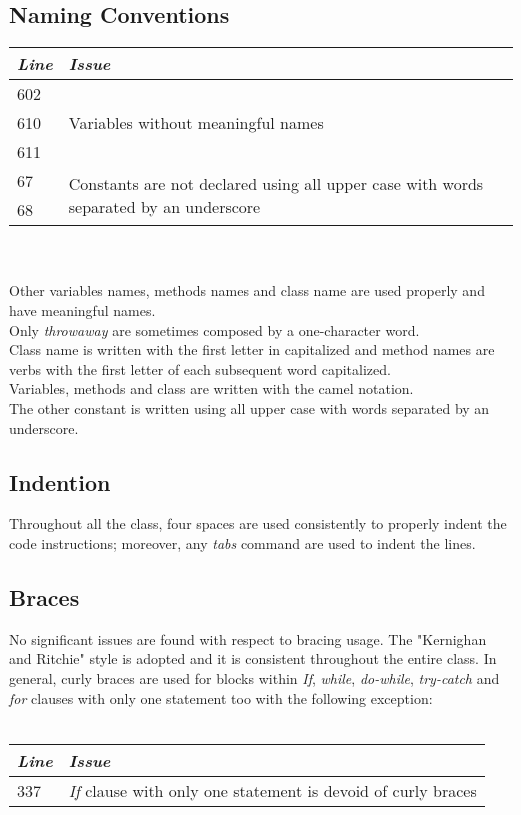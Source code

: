\documentclass[11pt,a4paper]{report}
\begin{document}
\subsection{Naming Conventions}
\begin{tabularx}{\textwidth}{|l|X|}
	\hline
	\textit{Line} & \textit{Issue}\\
	\hline \hline
	602 & \multirow{3}{*}{Variables without meaningful names}\\
	610 & \\
	611 & \\
	\hline
	67 & \multirow{2}{\linewidth}{{Constants are not declared using all upper case with words separated by an underscore}}\\
	68 & \\
	\hline
\end{tabularx}
\\\\
Other variables names, methods names and class name are used properly and have meaningful names.\\Only \textit{throwaway} are sometimes composed by a one-character word.\\Class name is written with the first letter in capitalized and method names are verbs with the first letter of each subsequent word capitalized.\\Variables, methods and class are written with the camel notation.\\The other constant is written using all upper case with words separated by an underscore.
\subsection{Indention}
Throughout all the class, four spaces are used consistently to properly indent the code instructions; moreover, any \textit{tabs} command are used to indent the lines.
\subsection{Braces}
No significant issues are found with respect to bracing usage. The "Kernighan and Ritchie" style is adopted and it is consistent throughout the entire class. In general, curly braces are used for blocks within \textit{If}, \textit{while}, \textit{do-while}, \textit{try-catch} and \textit{for} clauses with only one statement too with the following exception:
\\\\
\begin{tabularx}{\textwidth}{|l|X|}
	\hline
	\textit{Line} & \textit{Issue}\\
	\hline
	\hline
	337 & \multirow{1}{*}{\textit{If} clause with only one statement is devoid of curly braces}\\
	\hline
\end{tabularx}
\end{document}
